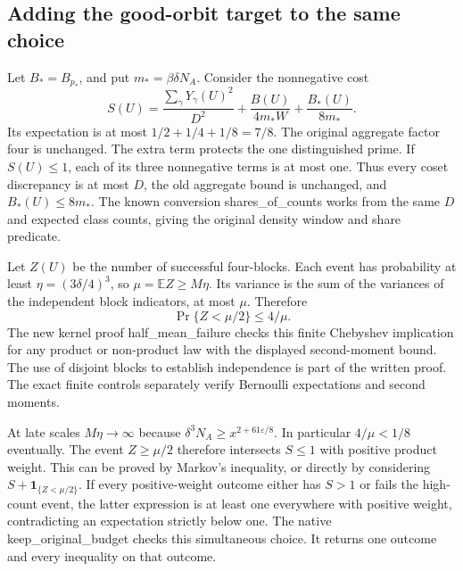\documentclass[12pt,letterpaper]{article}
\DeclareRobustCommand{\id}[1]{\mbox{\small\ttfamily #1}}
\begin{document}
\subsection{Adding the good-orbit target to the same choice}

Let \(B_\ast=B_{p_\ast}\), and put \(m_\ast=\beta\delta N_A\). Consider the nonnegative cost
\begin{equation}
 S(U)=\frac{\sum_\gamma Y_\gamma(U)^2}{D^2}
     +\frac{B(U)}{4m_\ast W}
     +\frac{B_\ast(U)}{8m_\ast}.
 \label{eq:joint-cost}
\end{equation}
Its expectation is at most \(1/2+1/4+1/8=7/8\). The original aggregate factor four is unchanged. The extra term protects the one distinguished prime. If \(S(U)\le1\), each of its three nonnegative terms is at most one. Thus every coset discrepancy is at most \(D\), the old aggregate bound is unchanged, and \(B_\ast(U)\le8m_\ast\). The known conversion \id{shares\_of\_counts} works from the same \(D\) and expected class counts, giving the original density window and share predicate.

Let \(Z(U)\) be the number of successful four-blocks. Each event has probability at least \(\eta=(3\delta/4)^3\), so \(\mu=\mathbb E Z\ge M\eta\). Its variance is the sum of the variances of the independent block indicators, at most \(\mu\). Therefore
\begin{equation}
              \Pr\{Z<\mu/2\}\le4/\mu .
 \label{eq:cheb}
\end{equation}
The new kernel proof \id{half\_mean\_failure} checks this finite Chebyshev implication for any product or non-product law with the displayed second-moment bound. The use of disjoint blocks to establish independence is part of the written proof. The exact finite controls separately verify Bernoulli expectations and second moments.

At late scales \(M\eta\to\infty\) because \(\delta^3 N_A\ge x^{2+61\varepsilon/8}\). In particular \(4/\mu<1/8\) eventually. The event \(Z\ge\mu/2\) therefore intersects \(S\le1\) with positive product weight. This can be proved by Markov's inequality, or directly by considering \(S+\mathbf1_{\{Z<\mu/2\}}\). If every positive-weight outcome either has \(S>1\) or fails the high-count event, the latter expression is at least one everywhere with positive weight, contradicting an expectation strictly below one. The native \id{keep\_original\_budget} checks this simultaneous choice. It returns one outcome and every inequality on that outcome.
\end{document}
